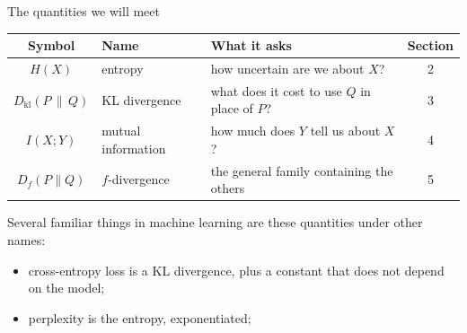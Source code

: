 \documentclass[aspectratio=169,9pt]{beamer}
\newcommand{\KL}[2]{D_{\mathrm{kl}}\!\left(#1 \,\|\, #2\right)}
\begin{document}
\begin{frame}{The quantities we will meet}
\begin{center}
\begin{tabular}{clp{5.8cm}c}
\toprule
\textbf{Symbol} & \textbf{Name} & \textbf{What it asks} & \textbf{Section} \\
\midrule
$H(X)$            & entropy            & how uncertain are we about $X$?                & 2 \\[0.12cm]
$\KL{P}{Q}$       & KL divergence      & what does it cost to use $Q$ in place of $P$?  & 3 \\[0.12cm]
$I(X;Y)$          & mutual information & how much does $Y$ tell us about $X$?           & 4 \\[0.12cm]
$D_f(P\|Q)$       & $f$-divergence     & the general family containing the others       & 5 \\
\bottomrule
\end{tabular}
\end{center}
\vspace{0.45cm}
\pause
Several familiar things in machine learning are these quantities under other names:
\begin{itemize}
    \item cross-entropy loss is a KL divergence, plus a constant that does not depend on the model;
    \item perplexity is the entropy, exponentiated;
\end{itemize}
\end{frame}
\end{document}
